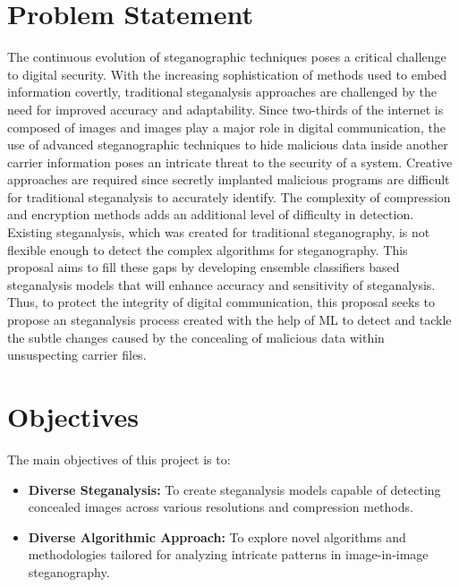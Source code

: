 \section{Problem Statement}
The continuous evolution of steganographic techniques poses a critical challenge to digital security. With the increasing sophistication of methods used to embed information covertly, traditional steganalysis approaches are challenged by the need for improved accuracy and adaptability. Since two-thirds of the internet is composed of images and images play a major role in digital communication, the use of advanced steganographic techniques to hide malicious data inside another carrier information poses an intricate threat to the security of a system. Creative approaches are required since secretly implanted malicious programs are difficult for traditional steganalysis to accurately identify. The complexity of compression and encryption methods adds an additional level of difficulty in detection. Existing steganalysis, which was created for traditional steganography, is not flexible enough to detect the complex algorithms for steganography. This proposal aims to fill these gaps by developing ensemble classifiers based steganalysis models that will enhance accuracy and sensitivity of steganalysis. Thus, to protect the integrity of digital communication, this proposal seeks to propose an steganalysis process created with the help of ML to detect and tackle the subtle changes caused by the concealing of malicious data within unsuspecting carrier files.
\clearpage
\section{Objectives}
The main objectives of this project is to:
\begin{itemize}
\item \textbf{Diverse Steganalysis:} To create steganalysis models capable of detecting concealed images across various  resolutions and compression methods.
\item \textbf{Diverse Algorithmic Approach:} To explore novel algorithms and methodologies tailored for analyzing intricate patterns in image-in-image steganography.
\end{itemize}


